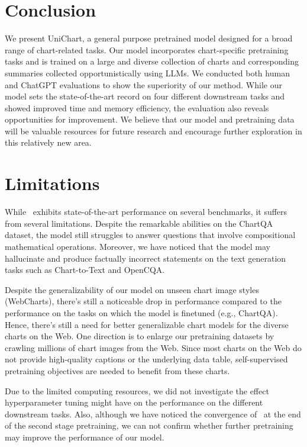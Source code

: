 \documentclass[11pt]{article}
\newcommand{\model}{\text{UniChart}}
\begin{document}

\section{Conclusion}
We present UniChart, a general purpose pretrained model designed for a broad range of chart-related tasks. 
Our model incorporates chart-specific pretraining tasks and is trained on a large and diverse collection of charts and corresponding summaries collected opportunistically using LLMs. 
We conducted both human and ChatGPT evaluations to show the superiority of our method. While our model sets the state-of-the-art record on four different downstream tasks and showed improved time and memory efficiency, the evaluation also reveals opportunities for improvement. 
We believe that our model and pretraining data will be valuable resources for future research and encourage further exploration in this  relatively new area.

\section*{Limitations}
While \model ~exhibits state-of-the-art performance on several benchmarks, it suffers from several limitations. Despite the remarkable abilities on the ChartQA dataset, the model still struggles to answer questions that involve compositional mathematical operations. Moreover, we have noticed that the model may hallucinate and produce factually incorrect statements on the text generation tasks such as Chart-to-Text and OpenCQA. 

Despite the generalizability of our model on unseen chart image styles (WebCharts), there's still a noticeable drop in performance compared to the performance on the tasks on which the model is finetuned (e.g., ChartQA). Hence, there's still a need for better generalizable chart models for the diverse charts on the Web. One direction is to enlarge our pretraining datasets by crawling millions of chart images from the Web. Since most charts on the Web do not provide high-quality captions or the underlying data table, self-supervised pretraining objectives are needed to benefit from these charts. 

Due to the limited computing resources, we did not investigate the effect hyperparameter tuning might have on the performance on the different downstream tasks. Also, although we have noticed the convergence of \model\ at the end of the second stage pretraining, we can not confirm whether further pretraining may improve the performance of our model. 
\end{document}
